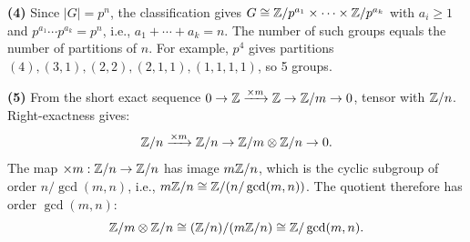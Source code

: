 \documentclass{report}
\begin{document}
\begin{solution}
\textbf{(4)} Since \(|G| = p^n\), the classification gives \(G \cong \ZZ/p^{a_1} \times \cdots \times \ZZ/p^{a_k}\) with \(a_i \geq 1\) and \(p^{a_1} \cdots p^{a_k} = p^n\), i.e., \(a_1 + \cdots + a_k = n\). The number of such groups equals the number of partitions of \(n\). For example, \(p^4\) gives partitions \((4), (3,1), (2,2), (2,1,1), (1,1,1,1)\), so 5 groups.

\textbf{(5)} From the short exact sequence \(0 \to \ZZ \xrightarrow{\times m} \ZZ \to \ZZ/m \to 0\), tensor with \(\ZZ/n\). Right-exactness gives:
\[\ZZ/n \xrightarrow{\times m} \ZZ/n \to \ZZ/m \otimes \ZZ/n \to 0.\]
The map \(\times m : \ZZ/n \to \ZZ/n\) has image \(m\ZZ/n\), which is the cyclic subgroup of order \(n/\gcd(m,n)\), i.e., \(m\ZZ/n \cong \ZZ/(n/\gcd(m,n))\). The quotient therefore has order \(\gcd(m,n)\):
\[\ZZ/m \otimes \ZZ/n \cong (\ZZ/n) / (m\ZZ/n) \cong \ZZ/\gcd(m,n).\]
\end{solution}
\end{document}
